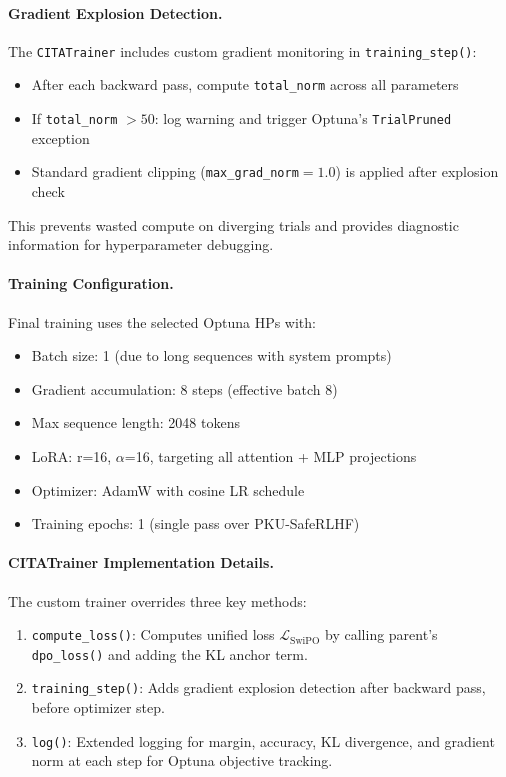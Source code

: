 \paragraph{Gradient Explosion Detection.} The \texttt{CITATrainer} includes custom gradient monitoring in \texttt{training\_step()}:
\begin{itemize}[leftmargin=*]
    \item After each backward pass, compute \texttt{total\_norm} across all parameters
    \item If \texttt{total\_norm} $> 50$: log warning and trigger Optuna's \texttt{TrialPruned} exception
    \item Standard gradient clipping (\texttt{max\_grad\_norm}$=1.0$) is applied after explosion check
\end{itemize}

This prevents wasted compute on diverging trials and provides diagnostic information for hyperparameter debugging.

\paragraph{Training Configuration.} Final training uses the selected Optuna HPs with:
\begin{itemize}[leftmargin=*]
    \item Batch size: 1 (due to long sequences with system prompts)
    \item Gradient accumulation: 8 steps (effective batch 8)
    \item Max sequence length: 2048 tokens
    \item LoRA: r=16, $\alpha$=16, targeting all attention + MLP projections
    \item Optimizer: AdamW with cosine LR schedule
    \item Training epochs: 1 (single pass over PKU-SafeRLHF)
\end{itemize}

\paragraph{CITATrainer Implementation Details.} The custom trainer overrides three key methods:

\begin{enumerate}[leftmargin=*]
    \item \texttt{compute\_loss()}: Computes unified loss $\mathcal{L}_{\mathrm{SwiPO}}$ by calling parent's \texttt{dpo\_loss()} and adding the KL anchor term.

    \item \texttt{training\_step()}: Adds gradient explosion detection after backward pass, before optimizer step.

    \item \texttt{log()}: Extended logging for margin, accuracy, KL divergence, and gradient norm at each step for Optuna objective tracking.
\end{enumerate}


